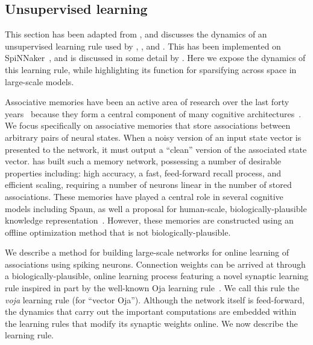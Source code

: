 \subsection{Unsupervised learning}
\label{sec:unsupervised}

This section has been adapted from \citet{voelker2014a}, and discusses the dynamics of an unsupervised learning rule used by \citet{voelker2014controlling}, \citet{trujillo2014a}, and \citet{aubin2016a}.
This has been implemented on SpiNNaker~\citep{knight2016}, and is discussed in some detail by \citet{aubin2018}.
Here we expose the dynamics of this learning rule, while highlighting its function for sparsifying across space in large-scale models.

Associative memories have been an active area of research over the last forty years~\citep{willshaw1969nonholographic, kohonen1972, hopfield1982} because they form a central component of many cognitive architectures~\citep{Pollack1988, Anderson1998}.
We focus specifically on associative memories that store associations between arbitrary pairs of neural states.
When a noisy version of an input state vector is presented to the network, it must output a ``clean'' version of the associated state vector.
\citet{stewart2011biologically} has built such a memory network, possessing a number of desirable properties including: high accuracy, a fast, feed-forward recall process, and efficient scaling, requiring a number of neurons linear in the number of stored associations.
 These memories have played a central role in several cognitive models including Spaun, as well a proposal for human-scale, biologically-plausible knowledge representation~\citep{crawford2015}.
However, these memories are constructed using an offline optimization method that is not biologically-plausible.

We describe a method for building large-scale networks for online learning of associations using spiking neurons.
Connection weights can be arrived at through a biologically-plausible, online learning process featuring a novel synaptic learning rule inspired in part by the well-known Oja learning rule~\citep{oja1989neural}.
We call this rule the \emph{voja} learning rule (for ``vector Oja'').
Although the network itself is feed-forward, the dynamics that carry out the important computations are embedded within the learning rules that modify its synaptic weights online.
We now describe the learning rule.


